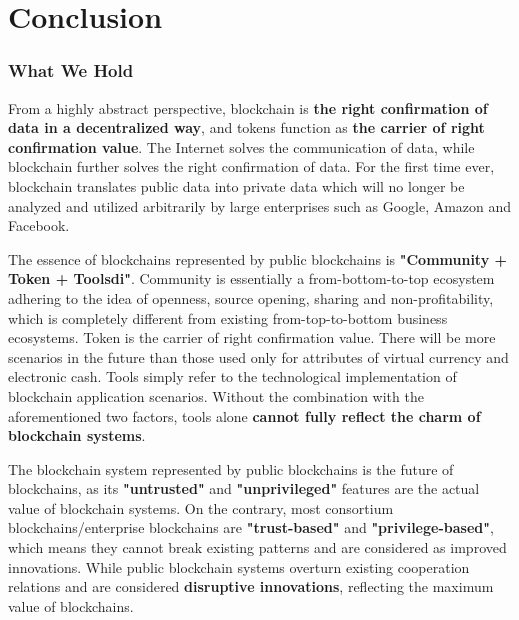 \section{Conclusion}
\label{sec:conclusion}

\subsubsection*{What We Hold}

From a highly abstract perspective, blockchain is \textbf{the right confirmation of data in a decentralized way}, and tokens function as \textbf{the carrier of right confirmation value}. The Internet solves the communication of data, while blockchain further solves the right confirmation of data. For the first time ever, blockchain translates public data into private data which will no longer be analyzed and utilized arbitrarily by large enterprises such as Google, Amazon and Facebook.


The essence of blockchains represented by public blockchains is \textbf{"Community + Token + Toolsdi"}. Community is essentially a from-bottom-to-top ecosystem adhering to the idea of openness, source opening, sharing and non-profitability, which is completely different from existing from-top-to-bottom business ecosystems. Token is the carrier of right confirmation value. There will be more scenarios in the future than those used only for attributes of virtual currency and electronic cash. Tools simply refer to the technological implementation of blockchain application scenarios. Without the combination with the aforementioned two factors, tools alone \textbf{cannot fully reflect the charm of blockchain systems}.


The blockchain system represented by public blockchains is the future of blockchains, as its \textbf{"untrusted"} and \textbf{"unprivileged"} features are the actual value of blockchain systems. On the contrary, most consortium blockchains/enterprise blockchains are \textbf{"trust-based"} and \textbf{"privilege-based"}, which means they cannot break existing patterns and are considered as improved innovations. While public blockchain systems overturn existing cooperation relations and are considered \textbf{disruptive innovations}, reflecting the maximum value of blockchains.

